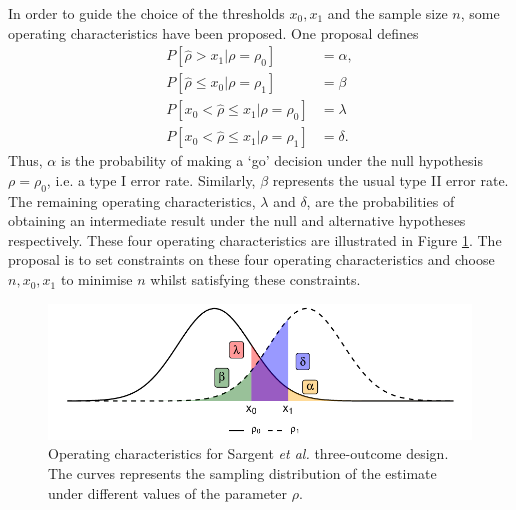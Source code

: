 \documentclass[Crown, times, sagev]{sagej}
\begin{document}
In order to guide the choice of the thresholds $x_0, x_1$ and the sample size $n$, some operating characteristics have been proposed. One proposal \cite{Sargent2001} defines 
\begin{equation}
\begin{aligned}
P[ \hat{\rho} > x_1 | \rho = \rho_0] & = \alpha, \\
P[ \hat{\rho} \leq x_0 | \rho = \rho_1] & = \beta \\
P[ x_0 < \hat{\rho} \leq x_1 | \rho = \rho_0] & = \lambda \\
P[ x_0 < \hat{\rho} \leq x_1 | \rho = \rho_1] & = \delta.
\end{aligned}
\end{equation}\label{eqn:Sarg_ocs}
Thus, $\alpha$ is the probability of making a `go' decision under the null hypothesis $\rho = \rho_0$, i.e. a type I error rate. Similarly, $\beta$ represents the usual type II error rate. The remaining operating characteristics, $\lambda$ and $\delta$, are the probabilities of obtaining an intermediate result under the null and alternative hypotheses respectively. These four operating characteristics are illustrated in Figure \ref{fig:Sarg_ocs}. The proposal is to set constraints on these four operating characteristics and choose $n, x_0, x_1$ to minimise $n$ whilst satisfying these constraints. 

\begin{figure}
\centering
\includegraphics[scale=0.8]{./figures/Sarg_ocs}
\caption{Operating characteristics for Sargent \emph{et al.} \cite{Sargent2001} three-outcome design. The curves represents the sampling distribution of the estimate under different values of the parameter $\rho$.}
\label{fig:Sarg_ocs}
\end{figure}
\end{document}
